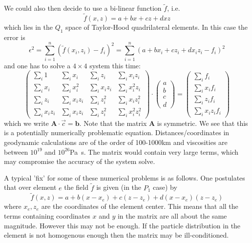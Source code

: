 \documentclass[a4paper,12pt]{article}
\begin{document}
We could also then decide to use a bi-linear function $\tilde{f}$, i.e.
\[
\tilde{f}(x,z)=a+bx+cz+dxz
\]
which lies in the $Q_1$ space of Taylor-Hood quadrilateral elements. In this case the error is 
\[
\epsilon^2 
= \sum_{i=1}^n ( \tilde{f}(x_i,z_i)-f_i)^2
= \sum_{i=1}^n (a+bx_i+cz_i + dx_iz_i -f_i)^2
\]
and one has to solve a $4\times 4$ system this time:
\[
\left( 
\begin{array}{cccc}
\sum\limits_i 1 & \sum\limits_i x_i & \sum\limits_i z_i & \sum\limits_i x_iz_i\\
\sum\limits_i x_i & \sum\limits_i x_i^2 & \sum\limits_i x_iz_i & \sum\limits_i x_i^2 z_i\\
\sum\limits_i z_i & \sum\limits_i x_i z_i & \sum\limits_i z_i^2 & \sum\limits_i x_iz_i^2\\ 
\sum\limits_i x_iz_i & \sum\limits_i x_i z_i & \sum\limits_i z_i^2 & \sum\limits_i x_i^2z_i^2  
\end{array}
\right)
\cdot
\left(
\begin{array}{c}
a\\
b\\
c\\
d
\end{array}
\right)
=
\left(
\begin{array}{c}
\sum\limits_i f_i \\
\sum\limits_i x_i f_i \\
\sum\limits_i z_i f_i \\
\sum\limits_i x_i z_i f_i 
\end{array}
\right)
\]
which we write ${\bm A}\cdot \vec{c}={\bm b}$. Note that 
the matrix ${\bm A}$ is symmetric.
We see that this is a potentially numerically problematic equation. 
Distances/coordinates in geodynamic calculations are of the order of 100-1000\si{\km} and 
viscosities are between $10^{19}$ and $10^{26}$\si{\pascal\second}. 
The matrix would contain very large terms, which may compromise the accuracy of the system solve.

A typical 'fix' for some of these numerical problems is as follows. One postulates that 
over element $e$ the field $\tilde{f}$ is given (in the $P_1$ case) by 
\[
\tilde{f}(x,z)=a+b(x-x_e)+c(z-z_e)+d(x-x_e)(z-z_e)
\]
where $x_e,z_e$ are the coordinates of the element center.
This means that all the terms containing coordinates $x$ and $y$ in the matrix 
are all about the same magnitude.
However this may not be enough. If the particle distribution in the element is 
not homogenous enough then the matrix may be ill-conditioned.
\end{document}
